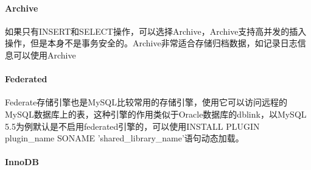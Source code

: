 \documentclass[../../../interview-questions.tex]{subfiles}
\begin{document}
 
\paragraph{Archive}

如果只有INSERT和SELECT操作，可以选择Archive，Archive支持高并发的插入操作，但是本身不是事务安全的。Archive非常适合存储归档数据，如记录日志信息可以使用Archive

\paragraph{Federated}

Federate存储引擎也是MySQL比较常用的存储引擎，使用它可以访问远程的MySQL数据库上的表，这种引擎的作用类似于Oracle数据库的dblink，以MySQL 5.5为例默认是不启用federated引擎的，可以使用INSTALL PLUGIN plugin\_name SONAME 'shared\_library\_name'语句动态加载。

\paragraph{InnoDB}
\end{document}
